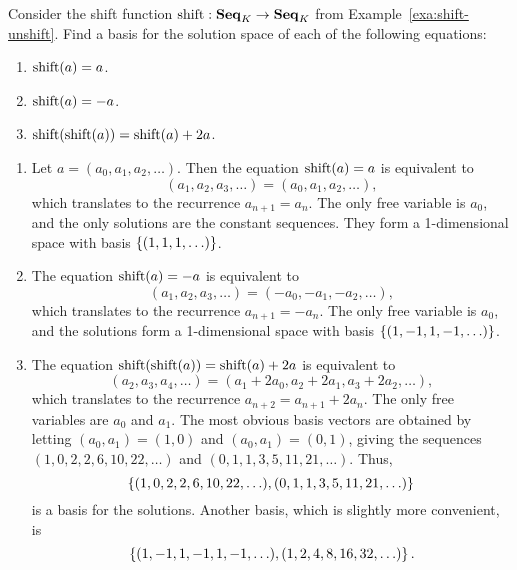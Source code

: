 \begin{ex}
  Consider the shift function $\shift:\Seq_K\to\Seq_K$ from
  Example~\ref{exa:shift-unshift}. Find a basis for the solution space
  of each of the following equations:
  \begin{enumerate}
  \item $\shift(a) = a$.
  \item $\shift(a) = -a$.
  \item $\shift(\shift(a)) = \shift(a) + 2a$.
  \end{enumerate}
  \begin{sol}
    \begin{enumerate}
    \item Let $a=(a_0,a_1,a_2,\ldots)$. Then the equation $\shift(a) =
      a$ is equivalent to
      \begin{equation*}
        (a_1,a_2,a_3,\ldots) = (a_0,a_1,a_2,\ldots),
      \end{equation*}
      which translates to the recurrence $a_{n+1}=a_n$. The only free
      variable is $a_0$, and the only solutions are the constant
      sequences. They form a 1-dimensional space with basis
      $\left\{(1,1,1,\ldots)\right\}$.
    \item The equation $\shift(a) = -a$ is equivalent to
      \begin{equation*}
        (a_1,a_2,a_3,\ldots) = (-a_0,-a_1,-a_2,\ldots),
      \end{equation*}
      which translates to the recurrence $a_{n+1} = -a_n$. The only
      free variable is $a_0$, and the solutions form a 1-dimensional
      space with basis $\left\{(1,-1,1,-1,\ldots)\right\}$.
    \item The equation $\shift(\shift(a)) = \shift(a) + 2a$ is
      equivalent to
      \begin{equation*}
        (a_2,a_3,a_4,\ldots) = (a_1+2a_0,a_2+2a_1,a_3+2a_2,\ldots),
      \end{equation*}
      which translates to the recurrence $a_{n+2} = a_{n+1} + 2a_n$.
      The only free variables are $a_0$ and $a_1$. The most obvious
      basis vectors are obtained by letting $(a_0,a_1)=(1,0)$ and
      $(a_0,a_1)=(0,1)$, giving the sequences
      $(1,0,2,2,6,10,22,\ldots)$ and $(0,1,1,3,5,11,21,\ldots)$. Thus,
      \begin{equation*}
        \left\{(1,0,2,2,6,10,22,\ldots), (0,1,1,3,5,11,21,\ldots)\right\}
      \end{equation*}
      is a basis for the solutions. Another basis, which is slightly
      more convenient, is
      \begin{equation*}
        \left\{(1,-1,1,-1,1,-1,\ldots), (1,2,4,8,16,32,\ldots)\right\}.
      \end{equation*}
    \end{enumerate}
  \end{sol}
\end{ex}

